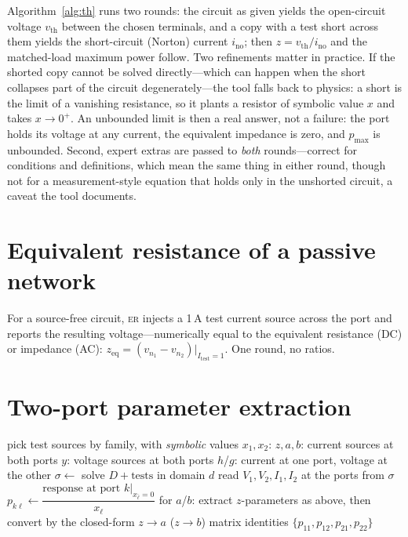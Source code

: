 \documentclass[11pt,oneside]{report}
\newcommand{\kw}[1]{\textsc{#1}}
\begin{document}
Algorithm~\ref{alg:th} runs two rounds: the circuit as given yields
the open-circuit voltage $v_\mathrm{th}$ between the chosen terminals,
and a copy with a test short across them yields the short-circuit
(Norton) current $i_\mathrm{no}$; then
$z = v_\mathrm{th}/i_\mathrm{no}$ and the matched-load maximum power
follow. Two refinements matter in practice. If the shorted copy cannot
be solved directly---which can happen when the short collapses part of
the circuit degenerately---the tool falls back to physics: a short is
the limit of a vanishing resistance, so it plants a resistor of
symbolic value $x$ and takes $x \to 0^+$. An unbounded limit is then a
real answer, not a failure: the port holds its voltage at any current,
the equivalent impedance is zero, and $p_\mathrm{max}$ is unbounded.
Second, expert extras are passed to \emph{both} rounds---correct for
conditions and definitions, which mean the same thing in either round,
though not for a measurement-style equation that holds only in the
unshorted circuit, a caveat the tool documents.

\section{Equivalent resistance of a passive network}
\label{sec:er}

For a source-free circuit, \kw{er} injects a 1\,A test current source
across the port and reports the resulting voltage---numerically equal
to the equivalent resistance (DC) or impedance (AC):
$z_\mathrm{eq} = (v_{n_1} - v_{n_2})\big|_{I_\mathrm{test}=1}$. One
round, no ratios.

\section{Two-port parameter extraction}
\label{sec:port}

\begin{algorithm}[htbp]
\caption{\kw{Port}$(D, n_1, n_2, \mathrm{family})$: two-port
  parameters in one solve}
\label{alg:port}
\begin{algorithmic}[1]
\State pick test sources by family, with \emph{symbolic} values
  $x_1, x_2$:
\Statex \quad $z, a, b$: current sources at both ports
\Statex \quad $y$: voltage sources at both ports
\Statex \quad $h$/$g$: current at one port, voltage at the other
\State $\sigma \gets$ solve $D + \text{tests}$ in domain $d$
\State read $V_1, V_2, I_1, I_2$ at the ports from $\sigma$
  \State $p_{k\ell} \gets \dfrac{\text{response at port } k
    \big|_{x_{\bar\ell} = 0}}{x_\ell}$
\EndFor
\State for $a$/$b$: extract $z$-parameters as above, then convert by
  the closed-form $z\!\to\!a$ ($z\!\to\!b$) matrix identities
\State \Return $\{p_{11}, p_{12}, p_{21}, p_{22}\}$
\end{algorithmic}
\end{algorithm}
\end{document}
